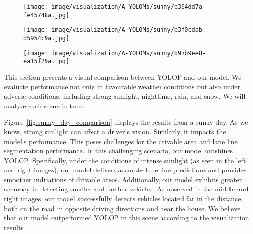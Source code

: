 \documentclass[lettersize,journal]{IEEEtran}
\begin{document}
{\begin{figure*}[!h]
    \medskip

\begin{subfigure}[b]{0.05\textwidth}
        \centering
        \vspace{0.1cm}
    \end{subfigure}\begin{subfigure}{0.25\textwidth}
        \centering
        \texttt{[image: image/visualization/A-YOLOMs/sunny/b394dd7a-fe45748a.jpg]}
    \end{subfigure}\hspace{0.5cm}
    \begin{subfigure}{0.25\textwidth}
        \centering
        \texttt{[image: image/visualization/A-YOLOMs/sunny/b3f0cdab-d5954c9a.jpg]}
    \end{subfigure}\hspace{0.5cm}
    \begin{subfigure}{0.25\textwidth}
        \centering
        \texttt{[image: image/visualization/A-YOLOMs/sunny/b97b9ee8-ea15f29a.jpg]}
    \end{subfigure}

    \caption{Visual Comparison of Results on a Sunny Day}
    \label{fig:sunny_day_comparison}
\end{figure*}
This section presents a visual comparison between YOLOP and our model. We evaluate performance not only in favourable weather conditions but also under adverse conditions, including strong sunlight, nighttime, rain, and snow. We will analyze each scene in turn. 

Figure~\ref{fig:sunny_day_comparison} displays the results from a sunny day. As we know, strong sunlight can affect a driver's vision. Similarly, it impacts the model's performance. This poses challenges for the drivable area and lane line segmentation performance. In this challenging scenario, our model outshines YOLOP. Specifically, under the conditions of intense sunlight (as seen in the left and right images), our model delivers accurate lane line predictions and provides smoother indications of drivable areas. Additionally, our model exhibits greater accuracy in detecting smaller and farther vehicles. As observed in the middle and right images, our model successfully detects vehicles located far in the distance, both on the road in opposite driving directions and near the house. We believe that our model outperformed YOLOP in this scene according to the visualization results.

}
\end{document}
